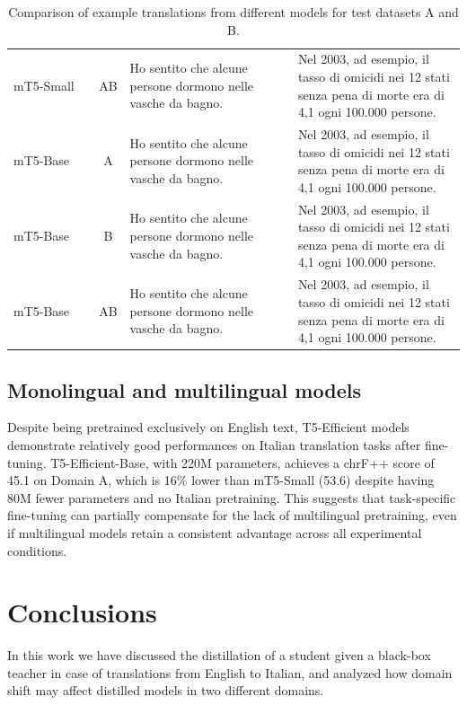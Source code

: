 \documentclass[pdflatex,sn-mathphys-num]{sn-jnl}%
\theoremstyle{thmstyleone}%
\theoremstyle{thmstyletwo}%
\theoremstyle{thmstylethree}%
\begin{document}
\begin{table}[htbp]
\begin{tabular}{p{0.2\linewidth} c p{0.4\linewidth} p{0.4\linewidth}}
		mT5-Small & AB & Ho sentito che alcune persone dormono nelle vasche da bagno. & Nel 2003, ad esempio, il tasso di omicidi nei 12 stati senza pena di morte era di 4,1 ogni 100.000 persone. \\
		mT5-Base & A & Ho sentito che alcune persone dormono nelle vasche da bagno. & Nel 2003, ad esempio, il tasso di omicidi nei 12 stati senza pena di morte era di 4,1 ogni 100.000 persone. \\
		mT5-Base & B & Ho sentito che alcune persone dormono nelle vasche da bagno. & Nel 2003, ad esempio, il tasso di omicidi nei 12 stati senza pena di morte era di 4,1 ogni 100.000 persone. \\
		mT5-Base & AB & Ho sentito che alcune persone dormono nelle vasche da bagno. & Nel 2003, ad esempio, il tasso di omicidi nei 12 stati senza pena di morte era di 4,1 ogni 100.000 persone. \\
		\hline
	\end{tabular}
	\vspace{4pt}
	\caption{Comparison of example translations from different models for test datasets A and B.}
	\label{tab:translation_examples}
\end{table}

\subsection{Monolingual and multilingual models}

Despite being pretrained exclusively on English text, T5-Efficient models demonstrate relatively good performances on Italian translation tasks after fine-tuning. T5-Efficient-Base, with 220M parameters, achieves a chrF++ score of 45.1 on Domain A, which is 16\% lower than mT5-Small (53.6) despite having 80M fewer parameters and no Italian pretraining. This suggests that task-specific fine-tuning can partially compensate for the lack of multilingual pretraining, even if multilingual models retain a consistent advantage across all experimental conditions.

\section{Conclusions}\label{sec4}

In this work we have discussed the distillation of a student given a black-box teacher in case of translations from English to Italian, and analyzed how domain shift may affect distilled models in two different domains.
\end{document}

